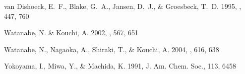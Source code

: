 \documentclass{aa}
\begin{document}
\begin{thebibliography}{38}
{van Dishoeck}, E.~F., {Blake}, G.~A., {Jansen}, D.~J., \& {Groesbeck}, T.~D.
  1995, \apj, 447, 760

{Watanabe}, N. \& {Kouchi}, A. 2002, \apj, 567, 651

{Watanabe}, N., {Nagaoka}, A., {Shiraki}, T., \& {Kouchi}, A. 2004, \apj, 616,
  638

{Yokoyama}, I., {Miwa}, Y., \& {Machida}, K. 1991, J. Am. Chem. Soc., 113, 6458

\end{thebibliography}
\end{document}
